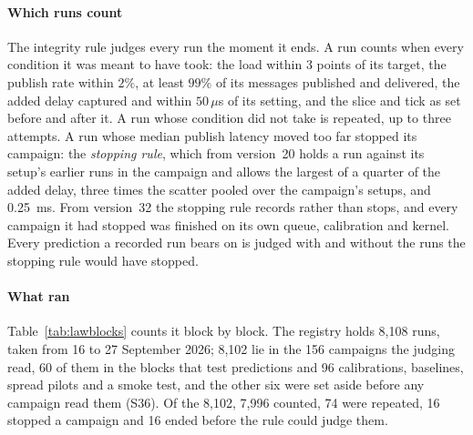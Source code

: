 \documentclass[10pt,journal,onecolumn]{IEEEtran}
\begin{document}
\paragraph{Which runs count} The integrity rule judges every run the moment it ends. A run counts
when every condition it was meant to have took: the load within 3 points of its target, the
publish rate within $2\%$, at least $99\%$ of its messages published and delivered, the added delay
captured and within $50\,\mu$s of its setting, and the slice and tick as set before and after it. A
run whose condition did not take is repeated, up to three attempts. A run whose median publish
latency moved too far stopped its campaign: the \emph{stopping rule}, which from version~20 holds a run
against its setup's earlier runs in the campaign and allows the largest of a quarter of the added
delay, three times the scatter pooled over the campaign's setups, and 0.25~ms. From version~32
the stopping rule records rather than stops, and every campaign it had stopped was finished on its own
queue, calibration and kernel. Every prediction a recorded run bears on is judged with and
without the runs the stopping rule would have stopped.

\paragraph{What ran} Table~\ref{tab:lawblocks} counts it block by block. The registry holds 8,108
runs, taken from 16 to 27 September 2026; 8,102 lie in the 156 campaigns the judging read, 60 of
them in the blocks that test predictions and 96 calibrations, baselines, spread pilots and a smoke test, and the
other six were set aside before any campaign read them (S36). Of the 8,102, 7,996 counted, 74 were repeated, 16 stopped a campaign and 16 ended before
the rule could judge them.
\end{document}
